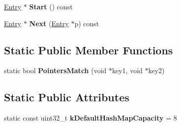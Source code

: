 \begin{DoxyCompactItemize}
\item 
\hyperlink{structv8_1_1internal_1_1_template_hash_map_impl_1_1_entry}{Entry} $\ast$ {\bfseries Start} () const \hypertarget{classv8_1_1internal_1_1_template_hash_map_impl_aa2f53fa47db0ec8d3370496d2f63ace0}{}\label{classv8_1_1internal_1_1_template_hash_map_impl_aa2f53fa47db0ec8d3370496d2f63ace0}

\item 
\hyperlink{structv8_1_1internal_1_1_template_hash_map_impl_1_1_entry}{Entry} $\ast$ {\bfseries Next} (\hyperlink{structv8_1_1internal_1_1_template_hash_map_impl_1_1_entry}{Entry} $\ast$p) const \hypertarget{classv8_1_1internal_1_1_template_hash_map_impl_aa2b27d2e082f0059860c347dc50bc1bf}{}\label{classv8_1_1internal_1_1_template_hash_map_impl_aa2b27d2e082f0059860c347dc50bc1bf}

\end{DoxyCompactItemize}
\subsection*{Static Public Member Functions}
\begin{DoxyCompactItemize}
\item 
static bool {\bfseries Pointers\+Match} (void $\ast$key1, void $\ast$key2)\hypertarget{classv8_1_1internal_1_1_template_hash_map_impl_acbf79c508addc62c4b0b0056bb440bd4}{}\label{classv8_1_1internal_1_1_template_hash_map_impl_acbf79c508addc62c4b0b0056bb440bd4}

\end{DoxyCompactItemize}
\subsection*{Static Public Attributes}
\begin{DoxyCompactItemize}
\item 
static const uint32\+\_\+t {\bfseries k\+Default\+Hash\+Map\+Capacity} = 8\hypertarget{classv8_1_1internal_1_1_template_hash_map_impl_a528fed70c08ca09b3ff3177ae573a575}{}\label{classv8_1_1internal_1_1_template_hash_map_impl_a528fed70c08ca09b3ff3177ae573a575}

\end{DoxyCompactItemize}
